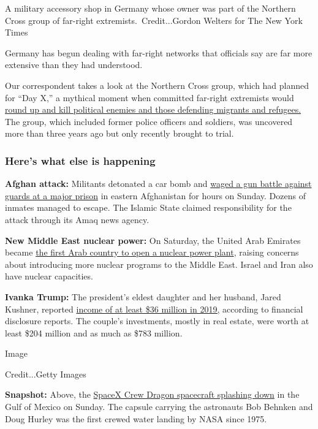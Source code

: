 A military accessory shop in Germany whose owner was part of the
Northern Cross group of far-right extremists.~Credit...Gordon Welters
for The New York Times

Germany has begun dealing with far-right networks that officials say are
far more extensive than they had understood.

Our correspondent takes a look at the Northern Cross group, which had
planned for ``Day X,'' a mythical moment when committed far-right
extremists would
\href{https://www.nytimes3xbfgragh.onion/2020/08/01/world/europe/germany-nazi-infiltration.html}{round
up and kill political enemies and those defending migrants and
refugees.} The group, which included former police officers and
soldiers, was uncovered more than three years ago but only recently
brought to trial.

\hypertarget{heres-what-else-is-happening}{%
\subsubsection{Here's what else is
happening}\label{heres-what-else-is-happening}}

\textbf{Afghan attack:} Militants detonated a car bomb and
\href{https://www.nytimes3xbfgragh.onion/2020/08/02/world/asia/afghan-prison-attack-prisoners.html}{waged
a gun battle against guards at a major prison} in eastern Afghanistan
for hours on Sunday. Dozens of inmates managed to escape. The Islamic
State claimed responsibility for the attack through its Amaq news
agency.

\textbf{New Middle East nuclear power:} On Saturday, the United Arab
Emirates became
\href{https://www.nytimes3xbfgragh.onion/2020/08/01/world/middleeast/uae-nuclear-Barakah.html}{the
first Arab country to open a nuclear power plant}, raising concerns
about introducing more nuclear programs to the Middle East. Israel and
Iran also have nuclear capacities.

\textbf{Ivanka Trump:} The president's eldest daughter and her husband,
Jared Kushner, reported
\href{https://www.nytimes3xbfgragh.onion/2020/08/01/business/ivanka-trump-jared-kushner-financial-disclosure.html}{income
of at least \$36 million in 2019,} according to financial disclosure
reports. The couple's investments, mostly in real estate, were worth at
least \$204 million and as much as \$783 million.

Image

Credit...Getty Images

\textbf{Snapshot:} Above, the
\href{https://www.nytimes3xbfgragh.onion/2020/08/02/science/spacex-nasa-return.html}{SpaceX
Crew Dragon spacecraft splashing down} in the Gulf of Mexico on Sunday.
The capsule carrying the astronauts Bob Behnken and Doug Hurley was the
first crewed water landing by NASA since 1975.


